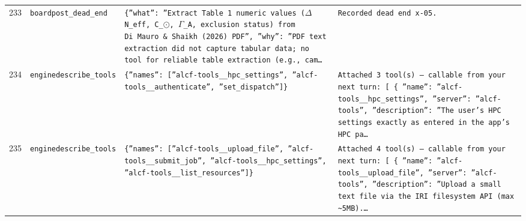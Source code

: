 \documentclass[11pt,a4paper]{article}
\begin{document}
\begin{longtable}{@{}p{}p{}p{}p{}@{}}
233 & \texttt{board}\newline\texttt{post\_\allowbreak{}dead\_\allowbreak{}end} & \texttt{\{''what'':\allowbreak{} ''Extract Table~1 numeric values ($\Delta$N\_\allowbreak{}eff,\allowbreak{} C\_\allowbreak{}$\odot$,\allowbreak{} $\Gamma$\_\allowbreak{}A,\allowbreak{} exclusion status)\allowbreak{} from Di~Mauro \& Shaikh (2026)\allowbreak{} PDF'',\allowbreak{} ''why'':\allowbreak{} ''PDF text extraction did not capture tabular data;\allowbreak{} no tool for reliable table extraction (e.g.,\allowbreak{} cam\ldots{}\allowbreak{}} & \texttt{Recorded dead end x-05.} \\
234 & \texttt{engine}\newline\texttt{describe\_\allowbreak{}tools} & \texttt{\{''names'':\allowbreak{} [''alcf-tools\_\allowbreak{}\_\allowbreak{}hpc\_\allowbreak{}settings'',\allowbreak{} ''alcf-tools\_\allowbreak{}\_\allowbreak{}authenticate'',\allowbreak{} ''set\_\allowbreak{}dispatch'']\allowbreak{}\}\allowbreak{}} & \texttt{Attached 3 tool(s)\allowbreak{} --- callable from your next turn:\allowbreak{} [  \{   ''name'':\allowbreak{} ''alcf-tools\_\allowbreak{}\_\allowbreak{}hpc\_\allowbreak{}settings'',\allowbreak{}   ''server'':\allowbreak{} ''alcf-tools'',\allowbreak{}   ''description'':\allowbreak{} ''The user's HPC settings exactly as entered in the app's HPC pa\ldots{}\allowbreak{}} \\
235 & \texttt{engine}\newline\texttt{describe\_\allowbreak{}tools} & \texttt{\{''names'':\allowbreak{} [''alcf-tools\_\allowbreak{}\_\allowbreak{}upload\_\allowbreak{}file'',\allowbreak{} ''alcf-tools\_\allowbreak{}\_\allowbreak{}submit\_\allowbreak{}job'',\allowbreak{} ''alcf-tools\_\allowbreak{}\_\allowbreak{}hpc\_\allowbreak{}settings'',\allowbreak{} ''alcf-tools\_\allowbreak{}\_\allowbreak{}list\_\allowbreak{}resources'']\allowbreak{}\}\allowbreak{}} & \texttt{Attached 4 tool(s)\allowbreak{} --- callable from your next turn:\allowbreak{} [  \{   ''name'':\allowbreak{} ''alcf-tools\_\allowbreak{}\_\allowbreak{}upload\_\allowbreak{}file'',\allowbreak{}   ''server'':\allowbreak{} ''alcf-tools'',\allowbreak{}   ''description'':\allowbreak{} ''Upload a small text file via the IRI filesystem API (max \textasciitilde{}\allowbreak{}5MB)\allowbreak{}.\ldots{}\allowbreak{}} \\

\end{longtable}
\end{document}
